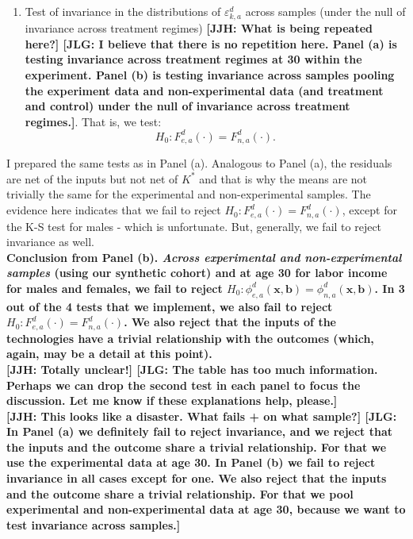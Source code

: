 \begin{enumerate}
\item Test of invariance in the distributions of $\varepsilon_{k,a}^d$ across samples (under the null of invariance across treatment regimes) \textbf{[JJH: What is being repeated here?] [JLG: I believe that there is no repetition here. Panel (a) is testing invariance across treatment regimes at 30 within the experiment. Panel (b) is testing invariance across samples pooling the experiment data and non-experimental data (and treatment and control) under the null of invariance across treatment regimes.]}. That is, we test:
	\begin{equation} 
	H_0: F_{e,a}^d \left( \cdot \right) = F_{n,a}^d \left( \cdot \right).
	\end{equation}
\end{enumerate}

\noindent I prepared the same tests as in Panel (a). Analogous to Panel (a), the residuals are net of the inputs but not net of $K^*$ and that is why the means are not trivially the same for the experimental and non-experimental samples. The evidence here indicates that we fail to reject $H_0: F_{e,a}^d \left( \cdot \right) = F_{n,a}^d \left( \cdot \right)$, except for the K-S test for males - which is unfortunate. But, generally, we fail to reject invariance as well.\\

\noindent \textbf{Conclusion from Panel (b). \textit{Across experimental and non-experimental samples} (using our synthetic cohort) and at age 30 for labor income for males and females, we fail to reject $H_0: \phi_{e,a}^d \left( \bm{x}, \bm{b} \right) = \phi_{n,a}^d \left( \bm{x}, \bm{b} \right)$. In 3 out of the 4 tests that we implement, we also fail to reject $H_0: F_{e,a}^d \left( \cdot \right) = F_{n,a}^d \left( \cdot \right)$. We also reject that the inputs of the technologies have a trivial relationship with the outcomes (which, again, may be a detail at this point).}\\ 

\noindent \textbf{[JJH: Totally unclear!] [JLG: The table has too much information. Perhaps we can drop the second test in each panel to focus the discussion. Let me know if these explanations help, please.]}\\

\noindent \textbf{[JJH: This looks like a disaster. What fails + on what sample?] [JLG: In Panel (a) we definitely fail to reject invariance, and we reject that the inputs and the outcome share a trivial relationship. For that we use the experimental data at age 30. In Panel (b) we fail to reject invariance in all cases except for one. We also reject that the inputs and the outcome share a trivial relationship. For that we pool experimental and non-experimental data at age 30, because we want to test invariance across samples.]}\\

